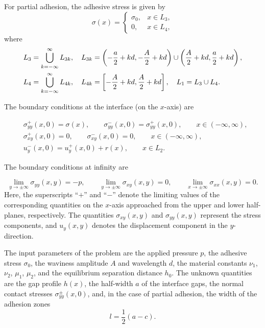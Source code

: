 For partial adhesion, the adhesive stress is given by
\begin{equation}
	\label{ChumakEq3}
	\sigma(x) =
	\begin{cases}
		\sigma_{0}, & x \in L_{3}, \\
		0,          & x \in L_{4},
	\end{cases}
\end{equation}
where
\begin{align}
	\notag
&L_{3} = \bigcup_{k=-\infty}^{\infty} L_{3k}, 
\quad
L_{3k} = \left(-\frac{a}{2} + kd, -\frac{A}{2} + kd\right)
\cup
\left(\frac{A}{2} + kd, \frac{a}{2} + kd\right),
\\
	\notag
&L_{4} = \bigcup_{k=-\infty}^{\infty} L_{4k}, 
\quad
L_{4k} = \left[-\frac{A}{2} + kd, \frac{A}{2} + kd\right],\quad L_{1} = L_{3} \cup L_{4}.
\end{align}

The boundary conditions at the interface (on the $x$-axis) are

\begin{align}
	\label{ChumakEq4}
	&\sigma_{yy}^{+}(x,0) = \sigma(x), 
	\qquad
	\sigma_{yy}^{-}(x,0) = \sigma_{yy}^{+}(x,0),
	\qquad x \in (-\infty,\infty),
\\
	\label{ChumakEq5}
	&\sigma_{xy}^{+}(x,0) = 0,
	\qquad
	\sigma_{xy}^{-}(x,0) = 0,
	\qquad x \in (-\infty,\infty),
\\
	\label{ChumakEq6}
	&u_{y}^{-}(x,0) = u_{y}^{+}(x,0) + r(x),
	\qquad x \in L_{2}.
\end{align}

The boundary conditions at infinity are

\begin{equation}
	\label{ChumakEq7}
	\lim_{y \to \pm\infty} \sigma_{yy}(x,y) = -p,
	\qquad
	\lim_{y \to \pm\infty} \sigma_{xy}(x,y) = 0,
	\qquad
	\lim_{x \to \pm\infty} \sigma_{xx}(x,y) = 0.
\end{equation}
%
Here, the superscripts ``$+$'' and ``$-$'' denote the limiting values of the corresponding quantities on the $x$-axis approached from the upper and lower half-planes, respectively. The quantities $\sigma_{xy}(x,y)$ and $\sigma_{yy}(x,y)$ represent the stress components, and $u_y(x,y)$ denotes the displacement component in the $y$-direction.

The input parameters of the problem are the applied pressure $p$, the adhesive stress $\sigma_{0}$, the waviness amplitude $A$ and wavelength $d$, the material constants $\nu_{1}$, $\nu_{2}$, $\mu_{1}$, $\mu_{2}$, and the equilibrium separation distance $h_{0}$. The unknown quantities are the gap profile $h(x)$, the half-width $a$ of the interface gaps, the normal contact stresses $\sigma_{yy}^{\pm}(x,0)$, and, in the case of partial adhesion, the width of the adhesion zones 
\[
l = \frac{1}{2}(a - c).
\]


